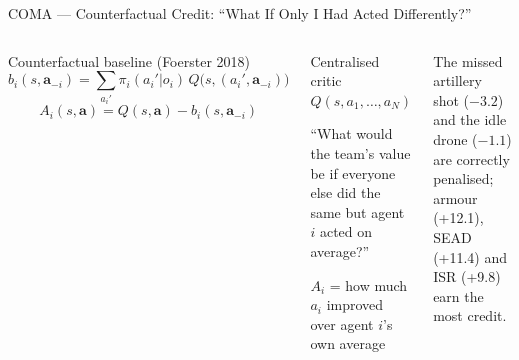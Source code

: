 \documentclass[aspectratio=169,10pt,t]{beamer}
\begin{document}
\begin{frame}{COMA --- Counterfactual Credit: ``What If Only I Had Acted Differently?''}
\begin{columns}[T]
\begin{fbx}{Counterfactual baseline (Foerster 2018)}\[b_i(s,\mathbf a_{-i})=\sum_{a_i'}\pi_i(a_i'|o_i)\,Q\big(s,(a_i',\mathbf a_{-i})\big)\]\[A_i(s,\mathbf a)=Q(s,\mathbf a)-b_i(s,\mathbf a_{-i})\]\end{fbx}
\begin{tl}\item Centralised critic $Q(s,a_1,\ldots,a_N)$\item ``What would the team's value be if everyone else did the same but agent $i$ acted on average?''\item $A_i$ = how much $a_i$ improved over agent $i$'s own average\end{tl}
\begin{rbox}\scriptsize The missed artillery shot ($-3.2$) and the idle drone ($-1.1$) are correctly penalised; armour (+12.1), SEAD (+11.4) and ISR (+9.8) earn the most credit.\end{rbox}
\end{columns}
\end{frame}
\end{document}
